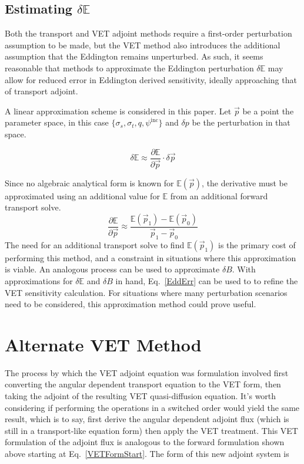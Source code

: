 \documentclass[12pt]{report}
\newcommand{\vp}{\vec{p}}
\newcommand{\Edd}{\mathbb{E}}
\newcommand{\BEdd}{B}
\begin{document}
\subsection{Estimating $\delta \Edd$}
Both the transport and VET adjoint methods require a first-order perturbation assumption to be made, but the VET method also introduces the additional assumption that the Eddington remains unperturbed. As such, it seems reasonable that methods to approximate the Eddington perturbation $\delta \Edd$ may allow for reduced error in Eddington derived sensitivity, ideally approaching that of transport adjoint. 

A linear approximation scheme is considered in this paper. Let $\vp$ be a point the  parameter space, in this case $\lbrace \sigma_s , \sigma_t, q, \psi^{\text{inc}} \rbrace$ and $\delta p$ be the perturbation in that space.

\begin{equation}
\delta \Edd \approx \frac{\partial \Edd}{\partial \vp} \cdot \delta \vp
\end{equation}

Since no algebraic analytical form is known for $\Edd ( \vp )$, the derivative must be approximated using an additional value for $\Edd$ from an additional forward transport solve.
\begin{equation}
\label{Eddapprox}
\frac{\partial \Edd}{\partial \vp} \approx \frac{\Edd(\vp_1) - \Edd(\vp_0)}{\vp_1 - \vp_0}
\end{equation}
The need for an additional transport solve to find $\Edd(\vp_1)$ is the primary cost of performing this method, and a constraint in situations where this approximation is viable. An analogous process can be used to approximate $\delta \BEdd$. With approximations for $\delta \Edd$ and $\delta \BEdd$ in hand, Eq.~\eqref{EddErr} can be used to to refine the VET sensitivity calculation. For situations where many perturbation scenarios need to be considered, this approximation method could prove useful. 

\section{Alternate VET Method}
The process by which the VET adjoint equation was formulation involved first converting the angular dependent transport equation to the VET form, then taking the adjoint of the resulting VET quasi-diffusion equation. It's worth considering if performing the operations in a switched order would yield the same result, which is to say, first derive the angular dependent adjoint flux (which is still in a transport-like equation form) then apply the VET treatment. This VET formulation of the adjoint flux is analogous to the forward formulation shown above starting at Eq.~\eqref{VETFormStart}. The form of this new adjoint system is
\end{document}
